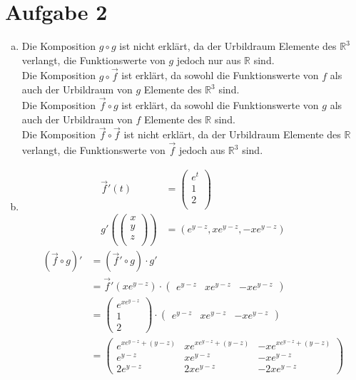 \documentclass[10pt,a4paper,parskip=half]{scrartcl}
\newcommand{\R}{\mathbb{R}}
\newcommand{\vecthree}[3]{\begin{pmatrix}#1\\#2\\#3\\\end {pmatrix}}
\begin{document}
\section*{Aufgabe 2}
\begin{enumerate}[(a)]
\item
Die Komposition $g \circ g$ ist nicht erklärt, da der Urbildraum Elemente des $\mathbb{\R}^3$ verlangt, die Funktionswerte von $g$ jedoch nur aus $\mathbb{\R}$ sind.\\
Die Komposition $g \circ \vec f$ ist erklärt, da sowohl die Funktionswerte von $f$ als auch der Urbildraum von $g$ Elemente des $\mathbb{\R}^3$ sind.\\
Die Komposition $\vec f \circ g$ ist erklärt, da sowohl die Funktionswerte von $g$ als auch der Urbildraum von $f$ Elemente des $\mathbb{\R}$ sind.\\
Die Komposition $\vec f \circ \vec f$ ist nicht erklärt, da der Urbildraum Elemente des $\mathbb{\R}$ verlangt, die Funktionswerte von $\vec f$ jedoch aus $\mathbb{\R}^3$ sind.\item
\begin{align*}
\vec f'(t) &= \vecthree{e^t}{1}{2} \\
g'(\vecthree{x}{y}{z}) &= \left(e^{y-z}, xe^{y-z}, -xe^{y-z}\right)
\end{align*}
\begin{align*} 
(\vec f \circ g)' &= (\vec f' \circ g) \cdot g' \\
&= \vec f'(xe^{y-z}) \cdot \begin{pmatrix}e^{y-z} & xe^{y-z} & -xe^{y-z}\end{pmatrix} \\
&= \begin{pmatrix}e^{xe^{y-z}} \\ 1\\2 \end{pmatrix} \cdot \begin{pmatrix}e^{y-z} & xe^{y-z} &  -xe^{y-z}\end{pmatrix}\\
&= \begin{pmatrix}e^{xe^{y-z}+\left(y-z\right)} & xe^{xe^{y-z}+\left(y-z\right)} & -xe^{xe^{y-z}+\left(y-z\right)} \\ e^{y-z} & xe^{y-z} &  -xe^{y-z} \\ 2e^{y-z} & 2xe^{y-z} &  -2xe^{y-z}\end{pmatrix}\\

\end{align*}
\end{enumerate}
\end{document}
